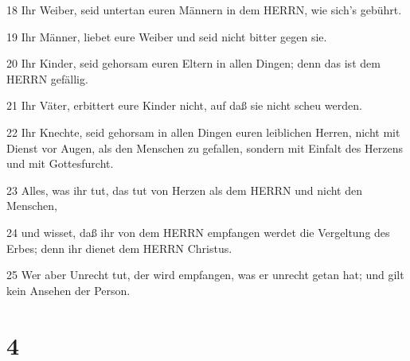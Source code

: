 \par 18 Ihr Weiber, seid untertan euren Männern in dem HERRN, wie sich's gebührt.
\par 19 Ihr Männer, liebet eure Weiber und seid nicht bitter gegen sie.
\par 20 Ihr Kinder, seid gehorsam euren Eltern in allen Dingen; denn das ist dem HERRN gefällig.
\par 21 Ihr Väter, erbittert eure Kinder nicht, auf daß sie nicht scheu werden.
\par 22 Ihr Knechte, seid gehorsam in allen Dingen euren leiblichen Herren, nicht mit Dienst vor Augen, als den Menschen zu gefallen, sondern mit Einfalt des Herzens und mit Gottesfurcht.
\par 23 Alles, was ihr tut, das tut von Herzen als dem HERRN und nicht den Menschen,
\par 24 und wisset, daß ihr von dem HERRN empfangen werdet die Vergeltung des Erbes; denn ihr dienet dem HERRN Christus.
\par 25 Wer aber Unrecht tut, der wird empfangen, was er unrecht getan hat; und gilt kein Ansehen der Person.

\chapter{4}

